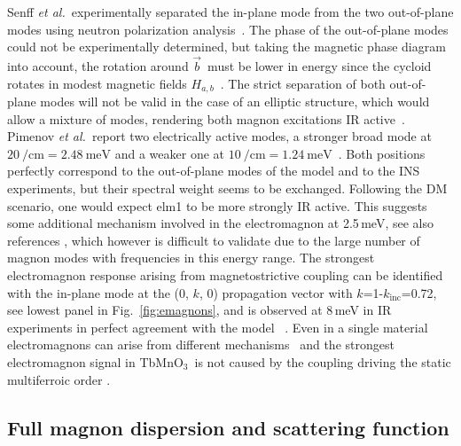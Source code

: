 \documentclass[aps,prb,twocolumn,superscriptaddress,showpacs,floatfix]{revtex4-2}
\newcommand{\tbmno}{TbMnO$_3$}
\newcommand{\baxis}{$\vec{b}$}
\newcommand{\etal}{\textit{et al.}}
\begin{document}
Senff \etal\ experimentally separated the in-plane mode from the two out-of-plane modes using neutron polarization analysis~\cite{Senff2007}.
The phase of the out-of-plane modes could not be experimentally determined, but taking the magnetic phase diagram into account,
the rotation around \baxis\ must be lower in energy since the cycloid rotates in modest magnetic fields $H_{a,b}$~\cite{Kimura2005,Aliouane2009}.
The strict separation of both out-of-plane modes will not be valid in the case of an elliptic structure, which would allow a mixture of modes, rendering both magnon excitations IR active~\cite{Senff2008a}.
Pimenov \etal\ report two electrically active modes, a stronger broad mode at $\SI{20}{\per\cm}=\SI{2.48}{\meV}$  and a weaker one at $\SI{10}{\per\cm}=\SI{1.24}{\meV}$~\cite{Pimenov2006,Pimenov2009}.
Both positions perfectly correspond to the out-of-plane modes of the model and to the INS experiments, but their spectral weight seems to be exchanged.
Following the DM scenario, one would expect elm1 to be more strongly IR active.
This suggests some additional mechanism involved in the electromagnon at 2.5\,meV, see also references , which however is difficult to validate due to the large number of magnon modes with frequencies in this energy range.
The strongest electromagnon response arising from magnetostrictive coupling can be identified with
the in-plane mode at the (0, $k$, 0) propagation vector with $k$=1-$k_{\textrm{inc}}$=0.72, see lowest panel in Fig.~\ref{fig:emagnons}, and is observed at 8\,meV in IR experiments in perfect agreement with the model ~\cite{ValdesAguilar2009,Finger2014,Takahashi2008}.
Even in a single material electromagnons can arise from different mechanisms~\cite{Katsura2007,ValdesAguilar2009,Mochizuki2010c} and the strongest electromagnon signal in \tbmno\ is not caused by the coupling driving the static multiferroic order \cite{ValdesAguilar2009,Finger2014}.

\subsection{Full magnon dispersion and scattering function}
\end{document}
